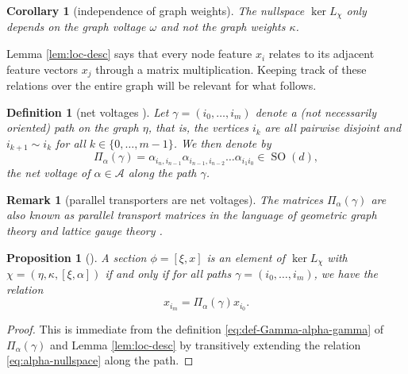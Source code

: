 \documentclass[10pt,reqno]{amsart}
\numberwithin{equation}{section}
\theoremstyle{bfnote}
\newtheorem{proposition}[theorem]{Proposition}
\newtheorem{corollary}[theorem]{Corollary}
\theoremstyle{bfdef}
\newtheorem{definition}[theorem]{Definition}
\newtheorem{remark}[theorem]{Remark}
\newcommand{\mc}[1]{\mathcal{#1}}
\DeclareMathOperator{\SO}{SO}
\providecommand\x; %
\renewcommand{\x}{x}
\providecommand\gt; %
\renewcommand{\gt}{\xi}
\providecommand\a; %
\renewcommand{\a}{\alpha}
\providecommand\hgen; %
\renewcommand{\hgen}{L}
\providecommand\vg; %
\renewcommand{\vg}{\chi}
\begin{document}
		\begin{corollary}[independence of graph weights]
			The nullspace $\ker \hgen_{\vg}$ only depends on the graph voltage $\omega$ and not the graph weights $\kappa$.
		\end{corollary}



		Lemma \ref{lem:loc-desc} says that every node feature $\x_i$ relates to its adjacent feature vectors $\x_j$ through a matrix multiplication. Keeping track of these relations over the entire graph will be relevant for what follows.

		\begin{definition}[{net voltages \cite[Section 2.1]{grossTopologicalGraphTheory1987}}]\label{def:net-voltages}
			Let $\gamma = (i_0, \dots , i_m)$ denote a (not necessarily oriented) path on the graph $\eta$, that is, the  vertices $i_{k}$ are all pairwise disjoint and $i_{k+1} \sim i_{k}$ for all $k \in \{0,\dots,m - 1\}$.
			We then denote by
			\begin{equation}\label{eq:def-Gamma-alpha-gamma}
				\Pi_{\a}(\gamma) = \a_{i_{n},i_{n-1}} \a_{i_{n -1}, i_{n-2}} \dots \a_{i_1 i_0} \in \SO(d),
			\end{equation}
			the \textit{net voltage} of $\a \in \mc{A}$ along the path $\gamma$.
		\end{definition}

		\begin{remark}[parallel transporters are net voltages]
			The matrices $\Pi_{\a}(\gamma)$ are also known as \textit{parallel transport matrices} in the language of geometric graph theory and lattice gauge theory \cite{Gattringer:2010zz,gaoGeometrySynchronizationProblems2019,bodnarNeuralSheafDiffusion2023}.
		\end{remark}

		\begin{proposition}[{\cite[Proposition 4]{bodnarNeuralSheafDiffusion2023}}]
			A section $\phi = [\gt,\x]$ is an element of $\ker \hgen_{\vg}$ with $\vg = (\eta,\kappa,[\xi,\a])$ if and only if for all paths $\gamma = (i_0, \dots , i_m)$, we have the relation
			\begin{equation}
				\x_{i_{m}} = \Pi_{\a}(\gamma) \x_{i_{0}}.
			\end{equation}
		\end{proposition}

		\begin{proof}
			This is immediate from the definition \eqref{eq:def-Gamma-alpha-gamma} of $\Pi_{\a}(\gamma)$ and Lemma \ref{lem:loc-desc} by transitively extending the relation \eqref{eq:alpha-nullspace} along the path.
		\end{proof}
\end{document}

